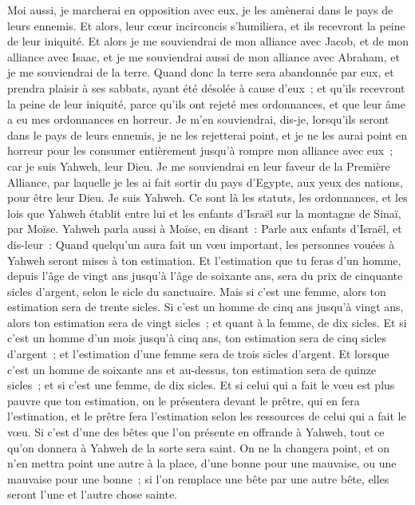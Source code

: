 \begin{multicols}{2}
Moi aussi, je marcherai en opposition avec eux, je les amènerai dans le pays de leurs ennemis. Et alors, leur cœur incirconcis s'humiliera, et ils recevront la peine de leur iniquité.
Et alors je me souviendrai de mon alliance avec Jacob, et de mon alliance avec Isaac, et je me souviendrai aussi de mon alliance avec Abraham, et je me souviendrai de la terre.
Quand donc la terre sera abandonnée par eux, et prendra plaisir à ses sabbats, ayant été désolée à cause d'eux~; et qu'ils recevront la peine de leur iniquité, parce qu'ils ont rejeté mes ordonnances, et que leur âme a eu mes ordonnances en horreur.
Je m'en souviendrai, dis-je, lorsqu'ils seront dans le pays de leurs ennemis, je ne les rejetterai point, et je ne les aurai point en horreur pour les consumer entièrement jusqu'à rompre mon alliance avec eux~; car je suis Yahweh, leur Dieu.
Je me souviendrai en leur faveur de la Première Alliance, par laquelle je les ai fait sortir du pays d'Egypte, aux yeux des nations, pour être leur Dieu. Je suis Yahweh.
Ce sont là les statuts, les ordonnances, et les lois que Yahweh établit entre lui et les enfants d'Israël sur la montagne de Sinaï, par Moïse.
\VerseOne{}Yahweh parla aussi à Moïse, en disant~:
Parle aux enfants d'Israël, et dis-leur~: Quand quelqu'un aura fait un vœu important, les personnes vouées à Yahweh seront mises à ton estimation.
Et l'estimation que tu feras d'un homme, depuis l'âge de vingt ans jusqu'à l'âge de soixante ans, sera du prix de cinquante sicles d'argent, selon le sicle du sanctuaire.
Mais si c'est une femme, alors ton estimation sera de trente sicles.
Si c'est un homme de cinq ans jusqu'à vingt ans, alors ton estimation sera de vingt sicles~; et quant à la femme, de dix sicles.
Et si c'est un homme d'un mois jusqu'à cinq ans, ton estimation sera de cinq sicles d'argent~; et l'estimation d'une femme sera de trois sicles d'argent.
Et lorsque c'est un homme de soixante ans et au-dessus, ton estimation sera de quinze sicles~; et si c'est une femme, de dix sicles.
Et si celui qui a fait le vœu est plus pauvre que ton estimation, on le présentera devant le prêtre, qui en fera l'estimation, et le prêtre fera l'estimation selon les ressources de celui qui a fait le vœu.
Si c'est d'une des bêtes que l'on présente en offrande à Yahweh, tout ce qu'on donnera à Yahweh de la sorte sera saint.
On ne la changera point, et on n'en mettra point une autre à la place, d'une bonne pour une mauvaise, ou une mauvaise pour une bonne~; si l'on remplace une bête par une autre bête, elles seront l'une et l'autre chose sainte.

\end{multicols}
